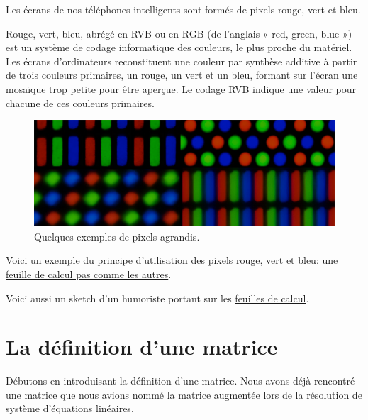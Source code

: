 \documentclass[]{book}
\theoremstyle{definition}
\theoremstyle{definition}
\theoremstyle{definition}
\theoremstyle{remark}
\let\BeginKnitrBlock\begin \let\EndKnitrBlock\end
\begin{document}
\BeginKnitrBlock{example}[Les photos numériques]
\protect\hypertarget{exm:unnamed-chunk-40}{}{\label{exm:unnamed-chunk-40} {} }Les écrans de nos téléphones intelligents sont formés de pixels rouge, vert et bleu.

Rouge, vert, bleu, abrégé en RVB ou en RGB (de l'anglais « red, green, blue ») est un système de codage informatique des couleurs, le plus proche du matériel. Les écrans d'ordinateurs reconstituent une couleur par synthèse additive à partir de trois couleurs primaires, un rouge, un vert et un bleu, formant sur l'écran une mosaïque trop petite pour être aperçue. Le codage RVB indique une valeur pour chacune de ces couleurs primaires.
\EndKnitrBlock{example}

\begin{figure}

{\centering \includegraphics[width=0.5\linewidth]{resources/images/pixels} 

}

\caption{Quelques exemples de pixels agrandis.}\label{fig:unnamed-chunk-41}
\end{figure}

Voici un exemple du principe d'utilisation des pixels rouge, vert et bleu: \href{https://docs.google.com/spreadsheets/d/e/2PACX-1vQlMpjcuG6vAjO40W1oMXe3J40wmDczGQEHzdvz1aHF_HadCymBE_OS-f197cYWvoGnnmqERiR7aKkw/pubhtml}{une feuille de calcul pas comme les autres}.

Voici aussi un sketch d'un humoriste portant sur les \href{https://www.youtube.com/watch?v=UBX2QQHlQ_I}{feuilles de calcul}.

\hypertarget{la-duxe9finition-dune-matrice}{%
\section{La définition d'une matrice}\label{la-duxe9finition-dune-matrice}}

Débutons en introduisant la définition d'une matrice. Nous avons déjà rencontré une matrice que nous avions nommé la matrice augmentée lors de la résolution de système d'équations linéaires.
\end{document}
